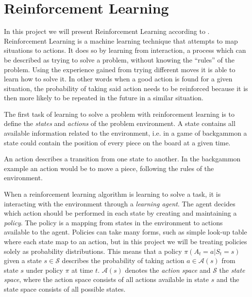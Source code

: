 \documentclass[11pt]{article}
\begin{document}
\maketitle

\section{Reinforcement Learning}

In this project we will present Reinforcement Learning according to
\cite{RLbook}.
Reinforcement Learning is a machine learning technique that attempts 
to map situations to actions.
It does so by learning from interaction, a process which can be described as trying to solve a problem,
without knowing the “rules” of the problem.
Using the experience gained from trying different moves it is able to learn how to solve it.
In other words when a good action is found for a given situation,
the probability of taking said action needs to be reinforced because it is then more likely to be
repeated in the future in a similar situation.

The first task of learning to solve a problem with reinforcement learning is to define
the \textit{states} and \textit{actions} of the problem environment.
A state contains all available information related to the environment,
i.e. in a game of backgammon a state could contain the position of every piece on the board at
a given time.

An action describes a transition from one state to another.
In the backgammon example an action would be to move a piece, following the rules of the
environment.

When a reinforcement learning algorithm is learning to solve a task, it is
interacting with the environment through a \textit{learning agent}.
The agent decides which action should be performed in each state by creating and maintaining a \textit{policy}.
The policy is a mapping from states in the environment to actions available to the agent.
Policies can take many forms, such as simple look-up table where each state map to an
action, but in this project we will be treating policies solely as probability distributions.
This means that a policy $\pi(A_t = a|S_t = s)$ given a state $s \in \mathcal{S}$ describes the
probability of taking action $a \in \mathcal{A}(s)$ from state $s$ under policy $\pi$ at time $t$.
$\mathcal{A}(s)$ denotes the \textit{action space} and $\mathcal{S}$ the \textit{state space},
where the action space consists of all actions available in state $s$ and the state space consists of
all possible states.
\end{document}

